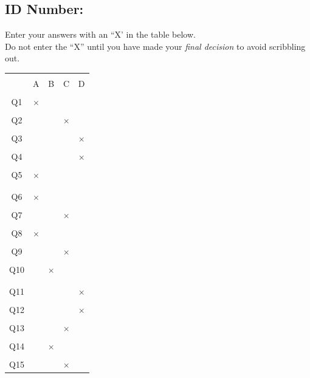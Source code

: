 \documentclass[12pt]{article}
\begin{document}
\subsection*{ID Number:\quad\underline{\hspace{10cm}}\\[0.5cm]}

Enter your answers with an ``X' in the table below.\\[0.3cm]
Do not enter the ``X'' until you have made your \emph{final decision} to avoid scribbling out.\\[0.3cm]
\begin{large}
\begin{center}
\begin{tabular}{|c|c|c|c|c|}
\hline
&&&&\\[-0.4cm]
 & A & B & C & D \\
\hline
&&&&\\[-0.4cm]
Q1 &$\times$&&& \\
\hline
&&&&\\[-0.4cm]
Q2 &&&$\times$& \\
\hline
&&&&\\[-0.4cm]
Q3 &&&&$\times$ \\
\hline
&&&&\\[-0.4cm]
Q4 &&&&$\times$ \\
\hline
&&&&\\[-0.4cm]
Q5 &$\times$&&& \\
\hline
\multicolumn{5}{c}{}\\[-0.3cm]
\hline
&&&&\\[-0.4cm]
Q6 &$\times$&&& \\
\hline
&&&&\\[-0.4cm]
Q7 &&&$\times$& \\
\hline
&&&&\\[-0.4cm]
Q8 &$\times$&&& \\
\hline
&&&&\\[-0.4cm]
Q9 &&&$\times$& \\
\hline
&&&&\\[-0.4cm]
Q10 &&$\times$&& \\
\hline
\multicolumn{5}{c}{}\\[-0.3cm]
\hline
&&&&\\[-0.4cm]
Q11 &&&&$\times$ \\
\hline
&&&&\\[-0.4cm]
Q12 &&&&$\times$ \\
\hline
&&&&\\[-0.4cm]
Q13 &&&$\times$& \\
\hline
&&&&\\[-0.4cm]
Q14 &&$\times$&& \\
\hline
&&&&\\[-0.4cm]
Q15 &&&$\times$& \\
\hline
\end{tabular}
\end{center}
\end{large}
\end{document}
